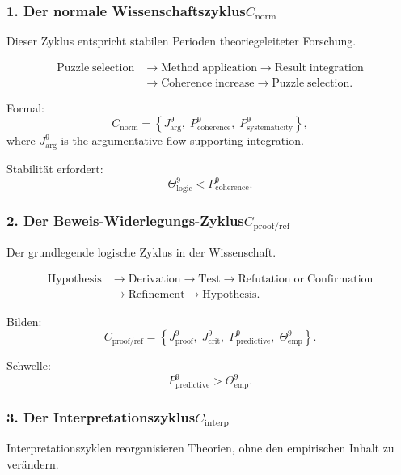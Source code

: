 \subsubsection{1. Der normale Wissenschaftszyklus$C_{\mathrm{norm}}$}

Dieser Zyklus entspricht stabilen Perioden theoriegeleiteter Forschung.

\[
  \begin{aligned}
  \mathrm{Puzzle\;selection}
  &\to \mathrm{Method\;application}
  \to \mathrm{Result\;integration}\\
  &\to \mathrm{Coherence\;increase}
  \to \mathrm{Puzzle\;selection}.
  \end{aligned}
\]

Formal:
\[
 C_{\mathrm{norm}}
 =
 \left\{
   J^9_{\mathrm{arg}},\;
   P^9_{\mathrm{coherence}},\;
   P^9_{\mathrm{systematicity}}
 \right\},
\]
where $J^9_{\mathrm{arg}}$ is the argumentative flow supporting integration.

Stabilität erfordert:
\[
  \Theta^9_\mathrm{logic} < P^9_{\mathrm{coherence}}.
\]


\subsubsection{2. Der Beweis-Widerlegungs-Zyklus$C_{\mathrm{proof/ref}}$}

Der grundlegende logische Zyklus in der Wissenschaft.

\[
  \begin{aligned}
  \mathrm{Hypothesis}
  &\to \mathrm{Derivation}
  \to \mathrm{Test}
  \to \mathrm{Refutation\;or\;Confirmation}\\
  &\to \mathrm{Refinement}
  \to \mathrm{Hypothesis}.
  \end{aligned}
\]

Bilden:
\[
 C_{\mathrm{proof/ref}}
  =
  \left\{
    J^9_{\mathrm{proof}},\;
    J^9_{\mathrm{crit}},\;
    P^9_{\mathrm{predictive}},\;
    \Theta^9_{\mathrm{emp}}
  \right\}.
\]

Schwelle:
\[
  P^9_{\mathrm{predictive}} > \Theta^9_\mathrm{emp}.
\]


\subsubsection{3. Der Interpretationszyklus$C_{\mathrm{interp}}$}

Interpretationszyklen reorganisieren Theorien, ohne den empirischen Inhalt zu verändern.

